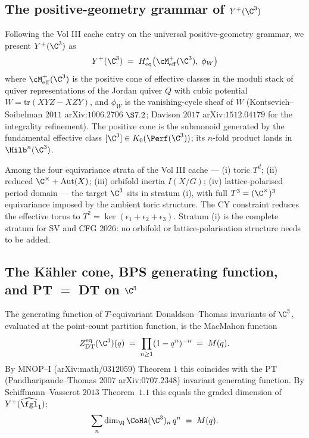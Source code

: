 \subsection*{The positive-geometry grammar of $Y^+(\C^3)$}

\begin{definition}
\label{def:universal-positive-geometry-c3-wave10}
\ClaimStatusDefinitional
Following the Vol III cache entry on the universal positive-geometry
grammar, we present $Y^+(\C^3)$ as
\[
 Y^+(\C^3) \;=\; H^*_{\mathrm{eq}}\bigl(\cM^+_{\mathrm{eff}}(\C^3),\;
 \phi_W\bigr)
\]
where $\cM^+_{\mathrm{eff}}(\C^3)$ is the positive cone of effective
classes in the moduli stack of quiver representations of the Jordan
quiver $Q$ with cubic potential $W = \mathrm{tr}(XYZ - XZY)$, and
$\phi_W$ is the vanishing-cycle sheaf of $W$ (Kontsevich--Soibelman
$2011$ arXiv:$1006.2706$ $\S 7.2$; Davison $2017$ arXiv:$1512.04179$
for the integrality refinement). The positive cone is the submonoid
generated by the fundamental effective class $[\C^3] \in
K_0(\Perf(\C^3))$; its $n$-fold product lands in $\Hilb^n(\C^3)$.
\end{definition}

\begin{remark}
\label{rem:four-equivariance-strata-c3-wave10}
Among the four equivariance strata of the Vol III cache — (i) toric
$T^d$; (ii) reduced $\C^\times + \mathrm{Aut}(X)$; (iii) orbifold
inertia $I(X/G)$; (iv) lattice-polarised period domain — the target
$\C^3$ sits in stratum (i), with full $T^3 = (\C^\times)^3$ equivariance
imposed by the ambient toric structure. The CY constraint reduces the
effective torus to $T^2 = \ker(\epsilon_1 + \epsilon_2 + \epsilon_3)$.
Stratum (i) is the complete stratum for SV and CFG $2026$: no orbifold
or lattice-polarisation structure needs to be added.
\end{remark}

\subsection*{The K\"ahler cone, BPS generating function, and PT $=$ DT on $\C^3$}

\begin{theorem}[PT $=$ DT $=$ MacMahon on $\C^3$]
\label{thm:macmahon-c3-wave10}
\ClaimStatusProvedElsewhere
The generating function of $T$-equivariant Donaldson--Thomas invariants
of $\C^3$, evaluated at the point-count partition function, is the
MacMahon function
\[
 Z_{\mathrm{DT}}^{\mathrm{eq}}(\C^3)(q) \;=\; \prod_{n \geq 1} (1 - q^n)^{-n}
 \;=\; M(q).
\]
By MNOP--$\mathrm{I}$ (arXiv:math/$0312059$) Theorem $1$ this coincides
with the PT (Pandharipande--Thomas $2007$ arXiv:$0707.2348$) invariant
generating function. By Schiffmann--Vasserot $2013$ Theorem~$1.1$ this
equals the graded dimension of $Y^+(\widehat{\fgl}_1)$:
\[
 \sum_n \dim_\Q \CoHA(\C^3)_n\, q^n \;=\; M(q).
\]
\end{theorem}

